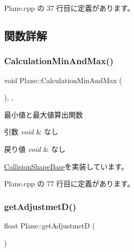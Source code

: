  Plane.\+cpp の 37 行目に定義があります。



\subsection{関数詳解}
\mbox{\label{class_plane_a8df0a1a800b32aa21a2a22c7cb52aa86}} 
\subsubsection{\texorpdfstring{Calculation\+Min\+And\+Max()}{CalculationMinAndMax()}}
{\footnotesize\ttfamily void Plane\+::\+Calculation\+Min\+And\+Max (\begin{DoxyParamCaption}{ }\end{DoxyParamCaption})\hspace{0.3cm}{\ttfamily [override]}, {\ttfamily [private]}, {\ttfamily [virtual]}}



最小値と最大値算出関数 


\begin{DoxyParams}{引数}
{\em void} & なし \\
\hline
\end{DoxyParams}

\begin{DoxyRetVals}{戻り値}
{\em void} & なし \\
\hline
\end{DoxyRetVals}


\mbox{\hyperlink{class_collision_shape_base_ad227c2f83038d7c05bc6b1d510cb4000}{Collision\+Shape\+Base}}を実装しています。



 Plane.\+cpp の 77 行目に定義があります。

\mbox{\label{class_plane_a66c47e8798df166c458ca215ed115684}} 
\subsubsection{\texorpdfstring{get\+Adjustmet\+D()}{getAdjustmetD()}}
{\footnotesize\ttfamily float Plane\+::get\+AdjustmetD (\begin{DoxyParamCaption}{ }\end{DoxyParamCaption})}



